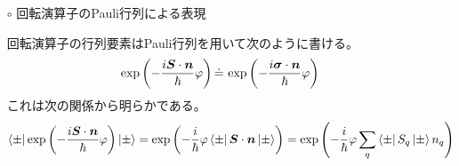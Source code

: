 \documentclass{jarticle}
\begin{document}
\begin{enumerate}
\begin{itemize}
  \item [$\circ$] 回転演算子のPauli行列による表現

    回転演算子の行列要素はPauli行列を用いて次のように書ける。
    \begin{align}
      \exp\qty(-\frac{i\bm{S}\cdot\bm{n}}{\hbar}\varphi) \, \dot{=} \, \exp\qty(-\frac{i\bm{\sigma}\cdot\bm{n}}{\hbar}\varphi)
    \end{align}
    これは次の関係から明らかである。
    \begin{align}
      \bra{\pm}\exp\qty(-\frac{i\bm{S}\cdot\bm{n}}{\hbar}\varphi)\ket{\pm} = \exp\qty(-\frac{i}{\hbar}\varphi\bra{\pm}\bm{S}\cdot\bm{n}\ket{\pm}) = \exp\qty(-\frac{i}{\hbar}\varphi\sum_{q}\bra{\pm}S_q\ket{\pm}n_q)
      \end{align}
    
  \end{itemize}
  
\end{enumerate}
\end{document}
